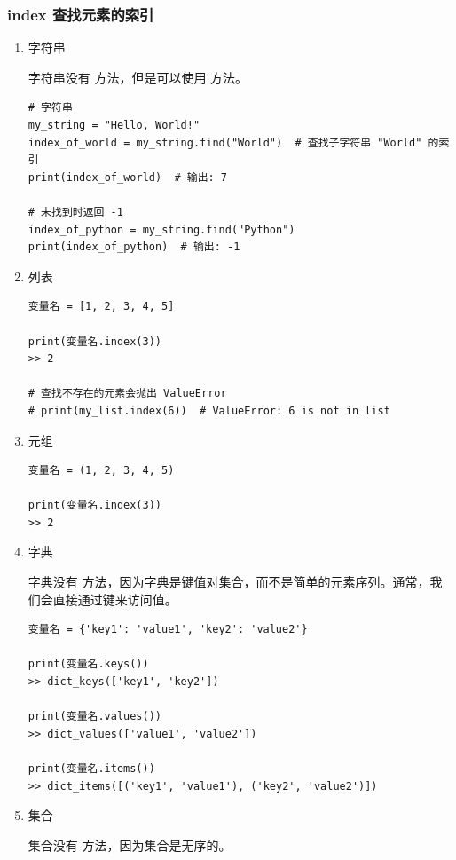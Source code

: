 \subsubsection{index 查找元素的索引}
\begin{enumerate}[label=\arabic*)]
    \item 字符串

    字符串没有  方法，但是可以使用  方法。

\begin{lstlisting}[style=demostyle,numbers=none]
# 字符串
my_string = "Hello, World!"
index_of_world = my_string.find("World")  # 查找子字符串 "World" 的索引
print(index_of_world)  # 输出: 7

# 未找到时返回 -1
index_of_python = my_string.find("Python")
print(index_of_python)  # 输出: -1
\end{lstlisting}

    \item 列表
\begin{lstlisting}[style=demostyle,numbers=none]
变量名 = [1, 2, 3, 4, 5]

print(变量名.index(3))
>> 2

# 查找不存在的元素会抛出 ValueError
# print(my_list.index(6))  # ValueError: 6 is not in list
\end{lstlisting}

    \item 元组
\begin{lstlisting}[style=demostyle,numbers=none]
变量名 = (1, 2, 3, 4, 5)

print(变量名.index(3))
>> 2
\end{lstlisting}

    \item 字典

    字典没有  方法，因为字典是键值对集合，而不是简单的元素序列。通常，我们会直接通过键来访问值。

\begin{lstlisting}[style=demostyle,numbers=none]
变量名 = {'key1': 'value1', 'key2': 'value2'}

print(变量名.keys())
>> dict_keys(['key1', 'key2'])

print(变量名.values())
>> dict_values(['value1', 'value2'])

print(变量名.items())
>> dict_items([('key1', 'value1'), ('key2', 'value2')])
\end{lstlisting}

    \item 集合  

    集合没有  方法，因为集合是无序的。
\end{enumerate}


